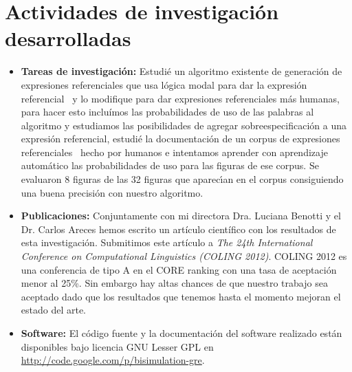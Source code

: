 \section{Actividades de investigaci\'on desarrolladas}
\label{progreso}

\begin{itemize}
\item \textbf{Tareas de investigaci\'on:}
Estudi\'e un algoritmo existente de generaci\'on de expresiones referenciales que usa l\'ogica modal para dar la 
expresi\'on referencial~\cite{Areces2008} y lo modifique para dar expresiones referenciales m\'as humanas, para hacer 
esto inclu\'imos las probabilidades de uso de las palabras al algoritmo y estudiamos las posibilidades de agregar 
sobreespecificaci\'on a una expresi\'on referencial, estudi\'e la documentaci\'on de un corpus de expresiones 
referenciales~\cite{viethen-dale:2011:UCNLG+Eval} hecho por humanos e intentamos aprender con aprendizaje autom\'atico 
las probabilidades de uso para las figuras de ese corpus. Se evaluaron 8 figuras de las 32 figuras que aparec\'{\i}an en 
el corpus consiguiendo una buena precisi\'on con nuestro algoritmo. 
\item \textbf{Publicaciones:} 
Conjuntamente con mi directora Dra. Luciana Benotti y el Dr. Carlos Areces hemos escrito un art\'iculo cient\'ifico con los resultados de esta investigaci\'on. Submitimos este art\'iculo a \emph{The 24th International Conference on Computational Linguistics (COLING 2012)}. COLING 2012 es una conferencia de tipo A en el CORE ranking con una tasa de aceptaci\'on menor al 25\%. Sin embargo hay altas chances de que nuestro trabajo sea aceptado dado que los resultados que tenemos hasta el momento mejoran el estado del arte.    
\item \textbf{Software:} El c\'odigo fuente y la documentaci\'on del software realizado est\'an disponibles bajo licencia GNU Lesser GPL en \url{http://code.google.com/p/bisimulation-gre}.


\end{itemize}
